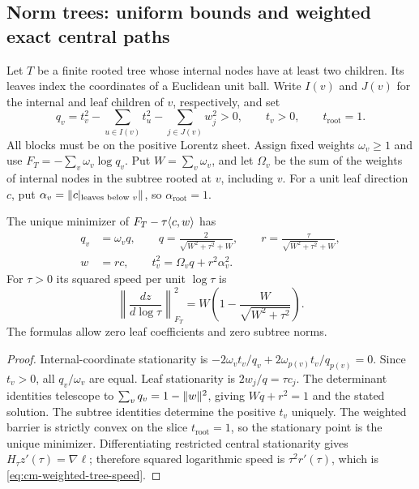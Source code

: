 \subsection{Norm trees: uniform bounds and weighted exact central paths}

Let $T$ be a finite rooted tree whose internal nodes have at least two
children.  Its leaves index the coordinates of a Euclidean unit ball.
Write $I(v)$ and $J(v)$ for the internal and leaf children of $v$, respectively, and set
\begin{equation}\label{eq:cm-tree-domain}
 q_v=t_v^2-\sum_{u\in I(v)}t_u^2-\sum_{j\in J(v)}w_j^2>0,
 \qquad t_v>0,\qquad t_{\mathrm{root}}=1.
\end{equation}
All blocks must be on the positive Lorentz sheet.  Assign fixed weights
$\omega_v\geq1$ and use $F_T=-\sum_v\omega_v\log q_v$.
Put $W=\sum_v\omega_v$, and let $\Omega_v$ be the sum of the
weights of internal nodes in the subtree rooted at $v$, including $v$.
For a unit leaf direction $c$, put
$\alpha_v=\lVert c|_{\text{leaves below }v}\rVert$, so
$\alpha_{\mathrm{root}}=1$.

\begin{proposition}\label{prop:cm-tree-central}
The unique minimizer of $F_T-\tau\langle c,w\rangle$ has
\begin{equation}\label{eq:cm-weighted-tree-central}
 \begin{split}
 q_v&=\omega_v q,\qquad
 q=\frac{2}{\sqrt{W^2+\tau^2}+W},\qquad
 r=\frac{\tau}{\sqrt{W^2+\tau^2}+W},\\
 w&=rc,\qquad t_v^2=\Omega_v q+r^2\alpha_v^2.
 \end{split}
\end{equation}
For $\tau>0$ its squared speed per unit $\log\tau$ is
\begin{equation}\label{eq:cm-weighted-tree-speed}
 \left\|\frac{dz}{d\log\tau}\right\|_{F_T}^2
 =W\left(1-\frac{W}{\sqrt{W^2+\tau^2}}\right).
\end{equation}
The formulas allow zero leaf coefficients and zero subtree norms.
\end{proposition}
\begin{proof}
Internal-coordinate stationarity is
$-2\omega_vt_v/q_v+2\omega_{p(v)}t_v/q_{p(v)}=0$.
Since $t_v>0$, all $q_v/\omega_v$ are equal.  Leaf stationarity is
$2w_j/q=\tau c_j$.  The determinant identities telescope to
$\sum_vq_v=1-\lVert w\rVert^2$, giving $Wq+r^2=1$ and the stated solution.
The subtree identities determine the positive $t_v$ uniquely.
The weighted barrier is strictly convex on the slice $t_{\mathrm{root}}=1$, so the stationary point is the unique minimizer.  Differentiating
restricted central stationarity gives $H_\tau z'(\tau)=\nabla\ell$;
therefore squared logarithmic speed is $\tau^2r'(\tau)$, which is
\eqref{eq:cm-weighted-tree-speed}.
\end{proof}

